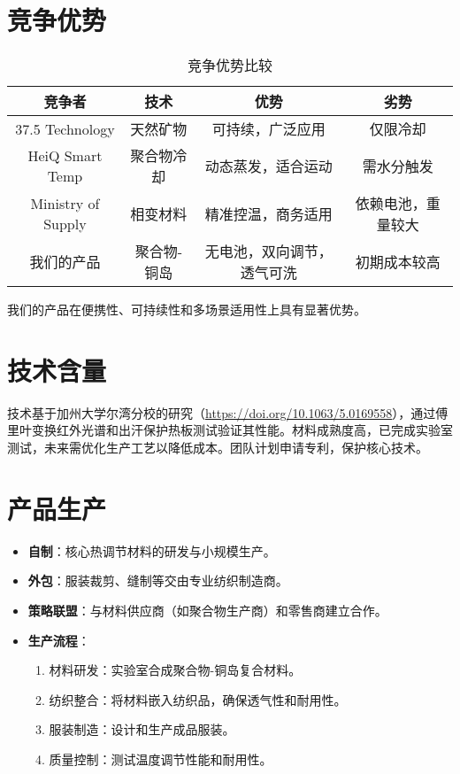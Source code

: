 \documentclass[UTF8]{report}
\theoremstyle{MyLineTheoremStyle} %
\theoremstyle{MyBlockTheoremStyle} %
\theoremstyle{MySubsubsectionStyle} %
\begin{document}
\section{竞争优势}
\begin{table}[h]
    \centering
    \begin{tabular}{|c|c|c|c|}
        \hline
        \textbf{竞争者} & \textbf{技术} & \textbf{优势} & \textbf{劣势} \\
        \hline
        37.5 Technology & 天然矿物 & 可持续，广泛应用 & 仅限冷却 \\
        \hline
        HeiQ Smart Temp & 聚合物冷却 & 动态蒸发，适合运动 & 需水分触发 \\
        \hline
        Ministry of Supply & 相变材料 & 精准控温，商务适用 & 依赖电池，重量较大 \\
        \hline
        我们的产品 & 聚合物-铜岛 & 无电池，双向调节，透气可洗 & 初期成本较高 \\
        \hline
    \end{tabular}
    \caption{竞争优势比较}
\end{table}
我们的产品在便携性、可持续性和多场景适用性上具有显著优势。

\section{技术含量}
技术基于加州大学尔湾分校的研究（\url{https://doi.org/10.1063/5.0169558}），通过傅里叶变换红外光谱和出汗保护热板测试验证其性能。材料成熟度高，已完成实验室测试，未来需优化生产工艺以降低成本。团队计划申请专利，保护核心技术。

\section{产品生产}
\begin{itemize}
    \item \textbf{自制}：核心热调节材料的研发与小规模生产。
    \item \textbf{外包}：服装裁剪、缝制等交由专业纺织制造商。
    \item \textbf{策略联盟}：与材料供应商（如聚合物生产商）和零售商建立合作。
    \item \textbf{生产流程}：
        \begin{enumerate}
            \item 材料研发：实验室合成聚合物-铜岛复合材料。
            \item 纺织整合：将材料嵌入纺织品，确保透气性和耐用性。
            \item 服装制造：设计和生产成品服装。
            \item 质量控制：测试温度调节性能和耐用性。
        \end{enumerate}
\end{itemize}
\end{document}
